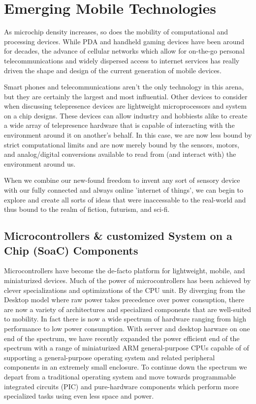 \documentclass[a4paper,12pt]{report}
\begin{document}
\section{Emerging Mobile Technologies}
As microchip density increases, so does the mobility of computational and processing devices. While PDA and handheld gaming devices have been around for decades, the advance of cellular networks which allow for on-the-go personal telecommunications and widely dispersed access to internet services has really driven the shape and design of the current generation of mobile devices.

Smart phones and telecommunications aren't the only technology in this arena, but they are certainly the largest and most influential. Other devices to consider when discussing telepresence devices are lightweight microprocessors and system on a chip designs. These devices can allow industry and hobbiests alike to create a wide array of telepresence hardware that is capable of interacting with the environment around it on another's behalf. In this case, we are now less bound by strict computational limits and are now merely bound by the sensors, motors, and analog/digital conversions available to read from (and interact with) the environment around us.

When we combine our new-found freedom to invent any sort of sensory device with our fully connected and always online 'internet of things', we can begin to explore and create all sorts of ideas that were inaccessable to the real-world and thus bound to the realm of fiction, futurism, and sci-fi.
\subsection{Microcontrollers \& customized System on a Chip (SoaC) Components}

Microcontrollers have become the de-facto platform for lightweight, mobile, and miniaturized devices. Much of the power of microcontrollers has been achieved by clever specializations and optimizations of the CPU unit. By diverging from the Desktop model where raw power takes precedence over power consuption, there are now a variety of architectures and specialized components that are well-suited to mobility. In fact there is now a wide spectrum of hardware ranging from high performance to low power consumption. With server and desktop harware on one end of the spectrum, we have recently expanded the power efficient end of the spectrum with a range of miniaturized ARM general-purpose CPUs capable of of supporting a general-purpose operating system and related peripheral components in an extremely small enclosure. To continue down the spectrum we depart from a traditional operating system and move towards programmable integrated circuits (PIC) and pure-hardware components which perform more specialized tasks using even less space and power.
\end{document}
